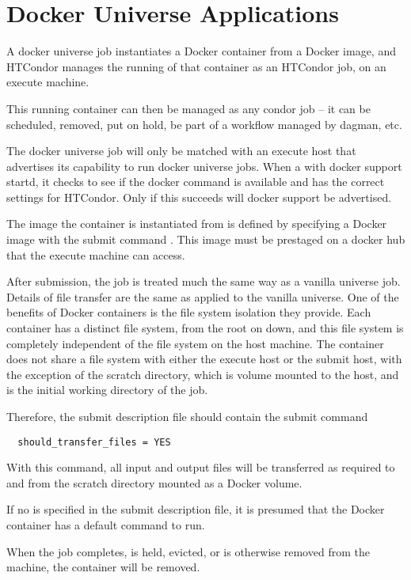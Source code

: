 \section{\label{sec:dockeruniverse}Docker Universe Applications}
A docker universe job instantiates a Docker container
from a Docker image, and HTCondor manages the running
of that container as an HTCondor job, on an execute machine.

This running container can then be managed as any condor job -- it can
be scheduled, removed, put on hold, be part of a workflow managed by 
dagman, etc.

The docker universe job will only be matched with an execute host
that advertises its capability to run docker universe jobs.
When a  with docker support startd, it checks to
see if the docker command is available and has the correct
settings for HTCondor.  Only if this succeeds will docker support
be advertised.

The image the container is instantiated from is
 defined by specifying a Docker image with the submit command
.  This image must be prestaged on a docker
hub that the execute machine can access.

After submission, the job is treated much the same way as a vanilla 
universe job.  Details of file transfer are the same as applied to 
the vanilla universe.  One of the benefits of Docker containers is 
the file system isolation they provide.  Each container has
a distinct file system, from the root on down, and this file
system is completely independent of the file system on the host machine.
The container does not share a file system with either the execute
host or the submit host, with the exception of the scratch directory,
which is volume mounted to the host, and is the initial working
directory of the job.

Therefore,
the submit description file should contain the submit command
\begin{verbatim}
  should_transfer_files = YES
\end{verbatim}
With this command,  all input and output files will be transferred
as required to and from the scratch directory mounted as a
Docker volume.

If no  is specified in the submit description file,
it is presumed that the Docker container has a default command to run.

When the job completes, is held, evicted, or is otherwise removed from the machine, the container will be removed.

